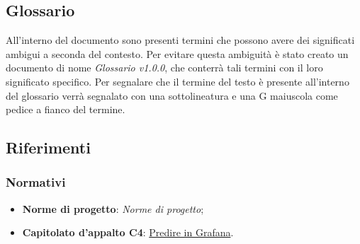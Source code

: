 \documentclass[../piano-di-qualifica.tex]{subfiles}
\begin{document}
\subsection{Glossario}%
\label{sub:glossario}
All'interno del documento sono presenti termini che possono avere dei significati ambigui a seconda del contesto. Per evitare questa ambiguità è stato creato un documento di nome \textit{Glossario v1.0.0}, che conterrà tali termini con il loro significato specifico. Per segnalare che il termine del testo è presente all'interno del glossario verrà segnalato con una sottolineatura e una G maiuscola come pedice a fianco del termine.

\subsection{Riferimenti}%
\label{sub:riferimenti}

\subsubsection{Normativi}%
\label{subs:normativi}
\begin{itemize}
    \item \textbf{Norme di progetto}: \textit{Norme di progetto};
    \item \textbf{Capitolato d'appalto C4}: \href{https://www.math.unipd.it/~tullio/IS-1/2019/Progetto/C4.pdf}{Predire in Grafana}.
\end{itemize}
\end{document}
